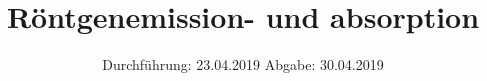 

\subject{V602}
\title{Röntgenemission- und absorption}
\date{%
  Durchführung: 23.04.2019
  \hspace{3em}
  Abgabe: 30.04.2019
}



\maketitle
\thispagestyle{empty}
\tableofcontents
\newpage






\printbibliography{}


